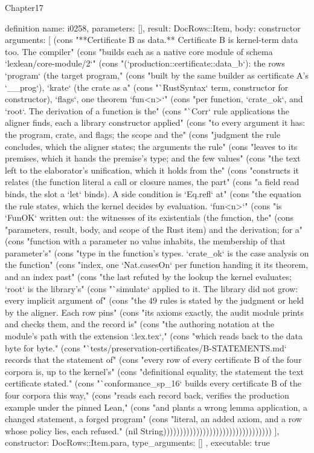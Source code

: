 \begin{lexlean}{Chapter17}
\begin{semanticmodule}
definition{
  name: i0258,
  parameters: [],
  result: DocRows::Item,
  body: constructor{
    arguments: [
      (cons "**Certificate B as data.** Certificate B is kernel-term data too. The compiler" (cons "builds each as a native core module of schema `lexlean/core-module/2`" (cons "(`production::certificate::data_b`): the rows `program` (the target program," (cons "built by the same builder as certificate A's `__prog`), `krate` (the crate as a" (cons "`RustSyntax` term, constructor for constructor), `flags`, one theorem `fun<n>`" (cons "per function, `crate_ok`, and `root`. The derivation of a function is the" (cons "`Corr` rule applications the aligner finds, each a library constructor applied" (cons "to every argument it has: the program, crate, and flags; the scope and the" (cons "judgment the rule concludes, which the aligner states; the arguments the rule" (cons "leaves to its premises, which it hands the premise's type; and the few values" (cons "the text left to the elaborator's unification, which it holds from the" (cons "constructs it relates (the function literal a call or closure names, the part" (cons "a field read binds, the slot a `let` binds). A side condition is `Eq.refl` at" (cons "the equation the rule states, which the kernel decides by evaluation. `fun<n>`" (cons "is `FunOK` written out: the witnesses of its existentials (the function, the" (cons "parameters, result, body, and scope of the Rust item) and the derivation; for a" (cons "function with a parameter no value inhabits, the membership of that parameter's" (cons "type in the function's types. `crate_ok` is the case analysis on the function" (cons "index, one `Nat.casesOn` per function handing it its theorem, and an index past" (cons "the last refuted by the lookup the kernel evaluates; `root` is the library's" (cons "`simulate` applied to it. The library did not grow: every implicit argument of" (cons "the 49 rules is stated by the judgment or held by the aligner. Each row pins" (cons "its axioms exactly, the audit module prints and checks them, and the record is" (cons "the authoring notation at the module's path with the extension `.lex.tex`," (cons "which reads back to the data byte for byte." (cons "`tests/preservation-certificates/B-STATEMENTS.md` records that the statement of" (cons "every row of every certificate B of the four corpora is, up to the kernel's" (cons "definitional equality, the statement the text certificate stated." (cons "`conformance_sp_16` builds every certificate B of the four corpora this way," (cons "reads each record back, verifies the production example under the pinned Lean," (cons "and plants a wrong lemma application, a changed statement, a forged program" (cons "literal, an added axiom, and a row whose policy lies, each refused." (nil String)))))))))))))))))))))))))))))))))
    ],
    constructor: DocRows::Item.para,
    type_arguments: []
  },
  executable: true
}


\end{semanticmodule}
\end{lexlean}
